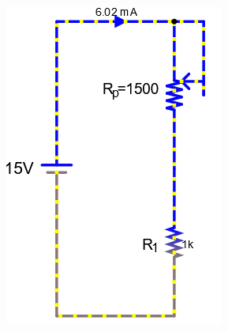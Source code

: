 \documentclass[a4paper]{article}
\begin{document}
\begin{figure}[H]
\begin{subfigure}{0.333\textwidth}
        \includegraphics[width=.9\linewidth]{pot6}
    \end{subfigure}
    \begin{subfigure}{0.333\textwidth}

\end{subfigure}
\end{figure}
\end{document}
